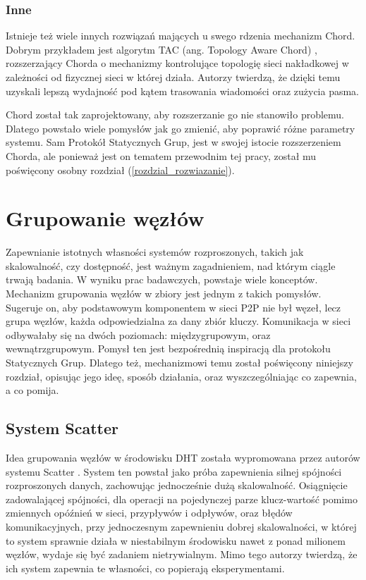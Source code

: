 \documentclass[12pt, twoside, openany]{report}
\begin{document}
\subsection{Inne}

Istnieje też wiele innych rozwiązań mających u swego rdzenia mechanizm Chord. Dobrym przykładem jest algorytm TAC (ang. Topology Aware Chord) \cite{bib:tac}, rozszerzający Chorda o mechanizmy kontrolujące topologię sieci nakładkowej w zależności od fizycznej sieci w której działa. Autorzy twierdzą, że dzięki temu uzyskali lepszą wydajność pod kątem trasowania wiadomości oraz zużycia pasma.

Chord został tak zaprojektowany, aby rozszerzanie go nie stanowiło problemu. Dlatego powstało wiele pomysłów jak go zmienić, aby poprawić różne parametry systemu. Sam Protokół Statycznych Grup, jest w swojej istocie rozszerzeniem Chorda, ale ponieważ jest on tematem przewodnim tej pracy, został mu poświęcony osobny rozdział (\ref{rozdzial_rozwiazanie}).


\chapter{Grupowanie węzłów}
\label{rozdzial_grupowanie}

Zapewnianie istotnych własności systemów rozproszonych, takich jak skalowalność, czy dostępność, jest ważnym zagadnieniem, nad którym ciągle trwają badania. W wyniku prac badawczych, powstaje wiele konceptów. Mechanizm grupowania węzłów w zbiory jest jednym z takich pomysłów. Sugeruje on, aby podstawowym komponentem w sieci P2P nie był węzeł, lecz grupa węzłów, każda odpowiedzialna za dany zbiór kluczy. Komunikacja w sieci odbywałaby się na dwóch poziomach: międzygrupowym, oraz wewnątrzgrupowym. Pomysł ten jest bezpośrednią inspiracją dla protokołu Statycznych Grup. Dlatego też, mechanizmowi temu został poświęcony niniejszy rozdział, opisując jego ideę, sposób działania, oraz wyszczególniając co zapewnia, a co pomija.

\section{System Scatter}
\label{subch_scatter}
Idea grupowania węzłów w środowisku DHT została wypromowana przez autorów systemu Scatter \cite{bib:scatter}. System ten powstał jako próba zapewnienia silnej spójności rozproszonych danych,
zachowując jednocześnie dużą skalowalność. Osiągnięcie zadowalającej spójności, dla operacji na pojedynczej parze klucz-wartość pomimo zmiennych opóźnień w sieci, przypływów i odpływów, oraz błędów komunikacyjnych, przy jednoczesnym zapewnieniu dobrej skalowalności, w której to system sprawnie działa w niestabilnym środowisku nawet z ponad milionem węzłów, wydaje się być zadaniem nietrywialnym. Mimo tego autorzy twierdzą, że ich system zapewnia te własności, co popierają eksperymentami.
\end{document}
